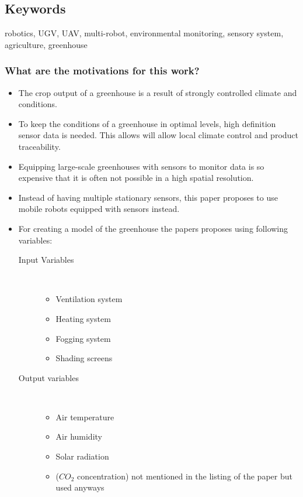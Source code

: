     
    \subsection*{Keywords}
    robotics, UGV, UAV, multi-robot, environmental monitoring, sensory system, agriculture, greenhouse
    
    
     
    \subsubsection*{What are the motivations for this work?}
    \begin{itemize} 
        \item The crop output of a greenhouse is a result of strongly controlled climate and conditions. 
        \item To keep the conditions of a greenhouse in optimal levels, high definition sensor data is needed. This allows will allow local climate control and product traceability.
        \item Equipping large-scale greenhouses with sensors to monitor data is so expensive that it is often not possible in a high spatial resolution.
        \item Instead of having multiple stationary sensors, this paper proposes to use mobile robots equipped with sensors instead.
        \item For creating a model of the greenhouse the papers proposes using following variables:\begin{description}
            \item[Input Variables]  \ 
            \begin{itemize}
                \item Ventilation system
                \item Heating system
                \item Fogging system
                \item Shading screens
            \end{itemize}
            \item[Output variables]   \ 
            \begin{itemize}
                \item Air temperature
                \item Air humidity
                \item Solar radiation
                \item ($CO_2$ concentration) not mentioned in the listing of the paper but used anyways

\end{itemize}
\end{description}
\end{itemize}
